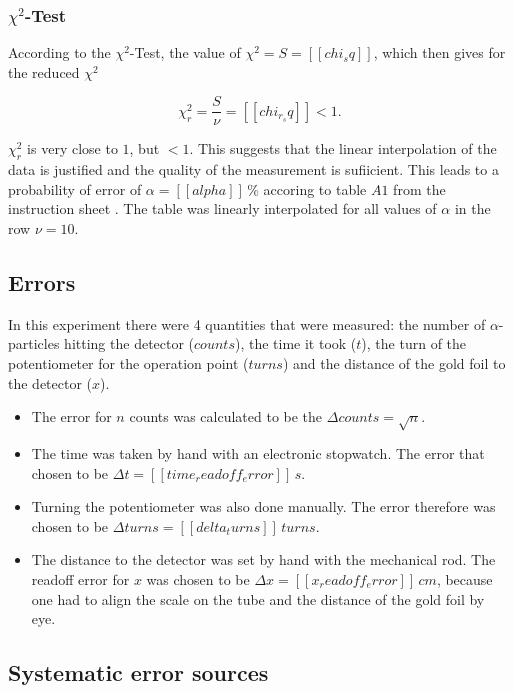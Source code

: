 \documentclass[a4paper]{article}
\begin{document}
\subsubsection{$\chi^2$-Test}

According to the $\chi^2$-Test, the value of $\chi^2 = S = [[chi_sq]]$, which then gives for the reduced $\chi^2$

\begin{equation}
\chi_r^2 = \frac{S}{\nu} = [[chi_r_sq]] < 1.
\end{equation}

$\chi_r^2$ is very close to $1$, but $<1$. This suggests that the linear interpolation of the data is justified and the quality of the measurement is sufiicient. This leads to a probability of error of $\alpha = [[alpha]] \, \%$ accoring to table $A1$ from the instruction sheet \cite{inst2007}. The table was linearly interpolated for all values of $\alpha$ in the row $\nu = 10$.

\subsection{Errors}

In this experiment there were 4 quantities that were measured: the number of $\alpha$-particles hitting the detector ($counts$), the time it took ($t$), the turn of the potentiometer for the operation point ($turns$) and the distance of the gold foil to the detector ($x$).

\begin{itemize}
\item The error for $n$ counts was calculated to be the $\Delta counts = \sqrt{n}$.
\item The time was taken by hand with an electronic stopwatch. The error that chosen to be $\Delta t = [[time_readoff_error]] \, s$.
\item Turning the potentiometer was also done manually. The error therefore was chosen to be $\Delta turns = [[delta_turns]] \, turns$.
\item The distance to the detector was set by hand with the mechanical rod. The readoff error for $x$ was chosen to be $\Delta x = [[x_readoff_error]] \, cm$, because one had to align the scale on the tube and the distance of the gold foil by eye.
\end{itemize}

\subsection{Systematic error sources}
\label{sec:systematic_errors}
\end{document}

